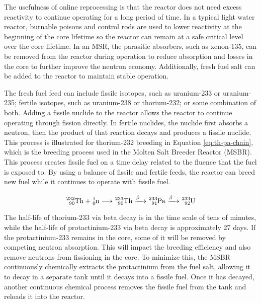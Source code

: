 The usefulness of online reprocessing is that the reactor does not need excess reactivity to continue operating for a long period of time.
In a typical light water reactor, burnable poisons and control rods are used to lower reactivity at the beginning of the core lifetime so the reactor can remain at a safe critical level over the core lifetime.
In an MSR, the parasitic absorbers, such as xenon-135, can be removed from the reactor during operation to reduce absorption and losses in the core to further improve the neutron economy.
Additionally, fresh fuel salt can be added to the reactor to maintain stable operation.

The fresh fuel feed can include fissile isotopes, such as uranium-233 or uranium-235; fertile isotopes, such as uranium-238 or thorium-232; or some combination of both.
Adding a fissile nuclide to the reactor allows the reactor to continue operating through fission directly.
In fertile nuclides, the nuclide first absorbs a neutron, then the product of that reaction decays and produces a fissile nuclide. This process is illustrated for thorium-232 breeding in Equation \eqref{eq:th-pa-chain}, which is the breeding process used in the Molten Salt Breeder Reactor (MSBR).
This process creates fissile fuel on a time delay related to the fluence that the fuel is exposed to.
By using a balance of fissile and fertile feeds, the reactor can breed new fuel while it continues to operate with fissile fuel.

\begin{equation} \hfill
\ce{^{232}_{90}Th} + \ce{^{1}_{0}n} \longrightarrow \ce{^{233}_{90}Th} \xrightarrow{\beta^-} \ce{^{233}_{91}Pa} \xrightarrow{\beta^-} \ce{^{233}_{92}U}
\hfill\label{eq:th-pa-chain} \end{equation}

The half-life of thorium-233 via beta decay is in the time scale of tens of minutes, while the half-life of protactinium-233 via beta decay is approximately 27 days.
If the protactinium-233 remains in the core, some of it will be removed by competing neutron absorption.
This will impact the breeding efficiency and also remove neutrons from fissioning in the core.
To minimize this, the MSBR continuously chemically extracts the protactinium from the fuel salt, allowing it to decay in a separate tank until it decays into a fissile fuel.
Once it has decayed, another continuous chemical process removes the fissile fuel from the tank and reloads it into the reactor.

